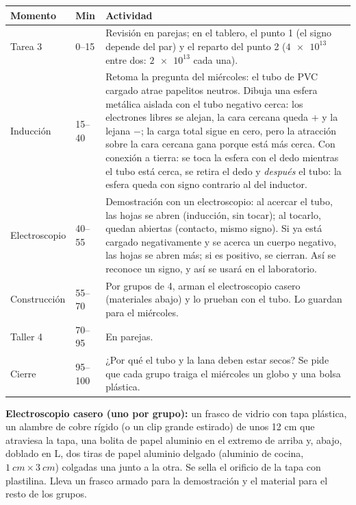 \documentclass[11pt]{article}
\begin{document}
\begin{center}
{\renewcommand{\arraystretch}{1.3}
\begin{tabularx}{\linewidth}{@{}l l X@{}}
  \toprule
  \textbf{Momento} & \textbf{Min} & \textbf{Actividad}\\
  \midrule
  Tarea 3 & 0–15 & Revisión en parejas; en el tablero, el punto 1 (el signo depende del par)
    y el reparto del punto 2 ($\num{4e13}$ entre dos: $\num{2e13}$ cada una).\\
  Inducción & 15–40 & Retoma la pregunta del miércoles: el tubo de PVC cargado atrae
    papelitos neutros. Dibuja una esfera metálica aislada con el tubo negativo cerca: los
    electrones libres se alejan, la cara cercana queda $+$ y la lejana $-$; la carga total
    sigue en cero, pero la atracción sobre la cara cercana gana porque está más cerca. Con
    conexión a tierra: se toca la esfera con el dedo mientras el tubo está cerca, se retira
    el dedo y \emph{después} el tubo: la esfera queda con signo contrario al del inductor.\\
  Electroscopio & 40–55 & Demostración con un electroscopio: al acercar el tubo, las hojas se
    abren (inducción, sin tocar); al tocarlo, quedan abiertas (contacto, mismo signo). Si ya
    está cargado negativamente y se acerca un cuerpo negativo, las hojas se abren más; si es
    positivo, se cierran. Así se reconoce un signo, y así se usará en el laboratorio.\\
  Construcción & 55–70 & Por grupos de 4, arman el electroscopio casero (materiales abajo) y
    lo prueban con el tubo. Lo guardan para el miércoles.\\
  Taller 4 & 70–95 & En parejas.\\
  Cierre & 95–100 & ¿Por qué el tubo y la lana deben estar secos? Se pide que cada grupo
    traiga el miércoles un globo y una bolsa plástica.\\
  \bottomrule
\end{tabularx}}
\end{center}

\begin{nota}
\textbf{Electroscopio casero (uno por grupo):} un frasco de vidrio con tapa plástica, un
alambre de cobre rígido (o un clip grande estirado) de unos 12 cm que atraviesa la tapa, una
bolita de papel aluminio en el extremo de arriba y, abajo, doblado en L, dos tiras de papel
aluminio delgado (aluminio de cocina, $\qty{1}{cm} \times \qty{3}{cm}$) colgadas una junto a
la otra. Se sella el orificio de la tapa con plastilina. Lleva un frasco armado para la
demostración y el material para el resto de los grupos.
\end{nota}
\end{document}
